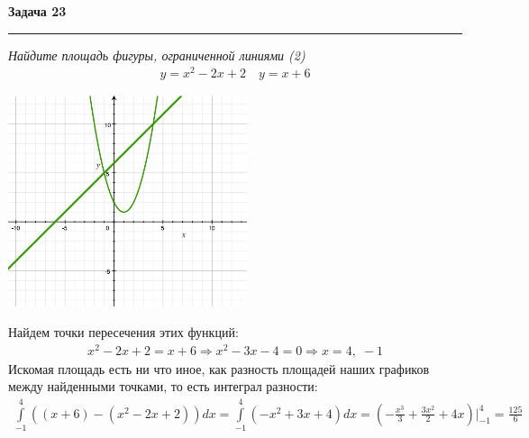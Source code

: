 \documentclass[a4paper,11pt]{article}
\begin{document}
\textbf{\large Задача 23}
\medskip\hrule\medskip
\textit{Найдите площадь фигуры, ограниченной линиями (2)}
\begin{align*}
y = x^2 - 2x + 2 \quad y = x + 6
\end{align*} 
\begin{center}
\includegraphics[width = 70mm]{images/231.png}
\end{center} 
Найдем точки пересечения этих функций: 
\begin{gather*}
x^2 - 2x + 2 = x + 6 \Rightarrow x^2 - 3x - 4 = 0 \Rightarrow x = 4, \; -1
\end{gather*}
Искомая площадь есть ни что иное, как разность площадей наших графиков между найденными точками, то есть интеграл разности:
\begin{gather*}
\int\limits_{-1}^4 ((x + 6) - (x^2 - 2x + 2))dx = 
\int\limits_{-1}^4 (-x^2 + 3x + 4)dx = 
(-\frac{x^3}3 + \frac{3x^2}{2} + 4x) \big |_{-1}^{4} = \frac{125}6   
\end{gather*}
\\ \\


\end{document}
